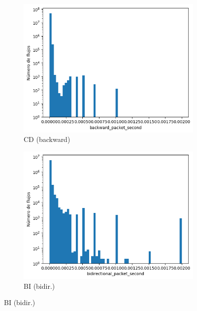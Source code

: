 \begin{figure}[H]
\begin{subfigure}[b]{0.26\textwidth}
        \includegraphics[width=\textwidth]{media/packet_pincer_cicddos/backward_packet_second_linear_x_log_y.png}
        \caption{CD (backward)}
    \end{subfigure}
    \hfill
    \begin{subfigure}[b]{0.26\textwidth}
        \centering
        \includegraphics[width=\linewidth]{media/packet_pincer_botiot/bidirectional_packet_second_linear_x_log_y.png}
        \caption{BI (bidir.)}

\end{subfigure}
\end{figure}
